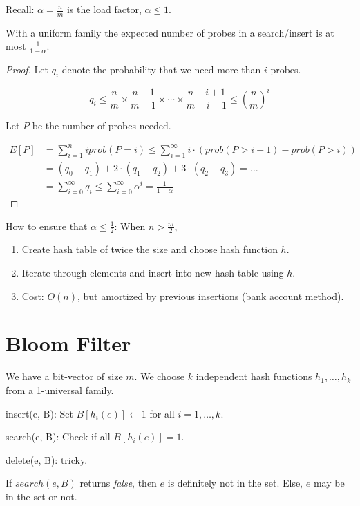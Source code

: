 Recall: $\alpha = \frac{n}{m}$ is the load factor, $\alpha \le 1$.

\begin{mytheorem}
With a uniform family the expected number of probes in a search/insert is at most $\frac{1}{1-\alpha}$.
\end{mytheorem}
\begin{proof}
Let $q_i$ denote the probability that we need more than $i$ probes.

$$q_i \le \frac{n}{m} \times \frac{n-1}{m-1} \times \cdots \times \frac{n-i+1}{m-i+1} \le \left (\frac{n}{m} \right )^i$$

Let $P$ be the number of probes needed.

\begin{align*}
E[P] & = \sum\limits_{i=1}^n i {prob}(P=i) \le \sum\limits_{i=1}^\infty i \cdot \left ({prob}(P>i-1) - {prob}(P > i) \right) \\
& = (q_0 - q_1) + 2 \cdot (q_1 - q_2) + 3 \cdot (q_2 - q_3) = \ldots \\
& = \sum\limits_{i=0}^\infty q_i \le  \sum\limits_{i=0}^\infty \alpha^i = \frac{1}{1-\alpha}
\end{align*}
\end{proof}

How to ensure that $\alpha \le \frac{1}{2}$: When $n > \frac{m}{2}$,
\begin{enumerate}
\item Create hash table of twice the size and choose hash function $h$.
\item Iterate through elements and insert into new hash table using $h$.
\item Cost: $O(n)$, but amortized by previous insertions (bank account method).
\end{enumerate}

\section{Bloom Filter}

We have a bit-vector of size $m$. We choose $k$ independent hash functions $h_1, \ldots, h_k$ from a 1-universal family.

\bigskip \noindent insert(e, B): Set $B[h_i(e)] \gets 1$ for all $i = 1, \ldots, k$.

\bigskip \noindent search(e, B): Check if all $B[h_i(e)] = 1$.

\bigskip \noindent delete(e, B): tricky.

\bigskip \noindent If $search(e, B)$ returns \emph{false}, then $e$ is definitely not in the set. Else, $e$ may be in the set or not.


